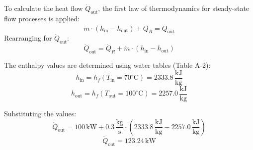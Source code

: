 To calculate the heat flow \( \dot{Q}_{\text{out}} \), the first law of thermodynamics for steady-state flow processes is applied:  
\[
\dot{m} \cdot (h_{\text{in}} - h_{\text{out}}) + \dot{Q}_R = \dot{Q}_{\text{out}}
\]  
Rearranging for \( \dot{Q}_{\text{out}} \):  
\[
\dot{Q}_{\text{out}} = \dot{Q}_R + \dot{m} \cdot (h_{\text{in}} - h_{\text{out}})
\]  

The enthalpy values are determined using water tables (Table A-2):  
\[
h_{\text{in}} = h_f(T_{\text{in}} = 70^\circ\text{C}) = 2333.8 \, \frac{\text{kJ}}{\text{kg}}
\]  
\[
h_{\text{out}} = h_f(T_{\text{out}} = 100^\circ\text{C}) = 2257.0 \, \frac{\text{kJ}}{\text{kg}}
\]  

Substituting the values:  
\[
\dot{Q}_{\text{out}} = 100 \, \text{kW} + 0.3 \, \frac{\text{kg}}{\text{s}} \cdot \left( 2333.8 \, \frac{\text{kJ}}{\text{kg}} - 2257.0 \, \frac{\text{kJ}}{\text{kg}} \right)
\]  
\[
\dot{Q}_{\text{out}} = 123.24 \, \text{kW}
\]